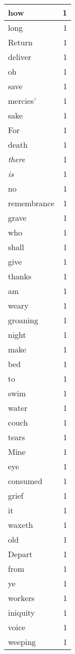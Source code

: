 \begin{center}
\begin{longtable}{l|r}
how & 1 \\ \hline
long & 1 \\ \hline
Return & 1 \\ \hline
deliver & 1 \\ \hline
oh & 1 \\ \hline
save & 1 \\ \hline
mercies' & 1 \\ \hline
sake & 1 \\ \hline
For & 1 \\ \hline
death & 1 \\ \hline
\emph{there} & 1 \\ \hline
\emph{is} & 1 \\ \hline
no & 1 \\ \hline
remembrance & 1 \\ \hline
grave & 1 \\ \hline
who & 1 \\ \hline
shall & 1 \\ \hline
give & 1 \\ \hline
thanks & 1 \\ \hline
am & 1 \\ \hline
weary & 1 \\ \hline
groaning & 1 \\ \hline
night & 1 \\ \hline
make & 1 \\ \hline
bed & 1 \\ \hline
to & 1 \\ \hline
swim & 1 \\ \hline
water & 1 \\ \hline
couch & 1 \\ \hline
tears & 1 \\ \hline
Mine & 1 \\ \hline
eye & 1 \\ \hline
consumed & 1 \\ \hline
grief & 1 \\ \hline
it & 1 \\ \hline
waxeth & 1 \\ \hline
old & 1 \\ \hline
Depart & 1 \\ \hline
from & 1 \\ \hline
ye & 1 \\ \hline
workers & 1 \\ \hline
iniquity & 1 \\ \hline
voice & 1 \\ \hline
weeping & 1 \\ \hline

\end{longtable}
\end{center}
